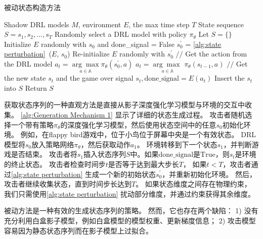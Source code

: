 \begin{algorithm}[!t]
    \caption{被动状态构造方法}
    \label{alg:Generation Mechanism 1}
    \begin{algorithmic}[1]
    \REQUIRE Shadow DRL models $M$, environment $E$, the max time step $T$
    \ENSURE State sequence $S = {s_1, s_2, ..., s_T}$
    \STATE Randomly select a DRL model with policy $\pi_{\theta}$
    \STATE Let $S = \{\}$
    \STATE Initialize $E$ randomly with $s_0$ and done\_signal = False
    \STATE $s_0^{\prime}$ = \autoref{alg:state perturbation}~($E$, $s_0$)
    \STATE Re-initialize $E$ randomly with $s_0^{\prime}$
    \STATE $//$ Get the action from the DRL model
    \STATE $a_t = \underset{a \in \mathbb{A}}{\arg \max \text{}} \pi_{\theta}(s_0^{\prime}, a) $
    \ELSE
    \STATE $a_t = \underset{a \in \mathbb{A}}{\arg \max \text{~}} \pi_{\theta}(s_{t-1}, a) $
    \ENDIF
    \STATE $//$ Get the new state $s_t$ and the game over signal
    \STATE $s_t, \text{done\_signal} = E(a_t) $
    \STATE Insert the $s_t$ into $S$
    \ENDFOR
    \STATE Return $S$
    \end{algorithmic}
\end{algorithm}
获取状态序列的一种直观方法是直接从影子深度强化学习模型与环境的交互中收集。
\autoref{alg:Generation Mechanism 1} 显示了详细的状态生成过程。
攻击者随机选择一个带有策略$\pi_{\theta}$的深度强化学习模型，然后使用状态空间中的任意$s_0$初始化环境。
例如，在flappy bird游戏中，位于小鸟位于屏幕中央是一个有效状态。
DRL模型将$s_0$放入策略网络$\pi_{\theta}$，然后获取动作$a_1$。
环境转移到下一个状态$s_1$，并判断游戏是否结束。
攻击者将$s_1$插入状态序列$S$中。如果$\text{done\_signal}$是$\text{True}$，则$s_t$是环境的终止状态。
攻击者检查时间步$t$是否等于达到最大步长$T$，
如果$t<T$，攻击者通过\autoref{alg:state perturbation} 生成一个新的初始状态$s^{\prime}_0$，并重新初始化环境。
然后，攻击者继续收集状态，直到时间步长达到$T$。
如果状态维度之间存在物理约束，
我们只需使用\autoref{alg:state perturbation} 扰动部分维度，并通过约束获得其余维度。

被动方法是一种有效的生成状态序列的策略。
然而，它也存在两个缺陷：
1) 没有充分利用白盒影子模型，例如白盒模型的模型权重、更新梯度信息；
2) 攻击模型容易因为静态状态序列而在影子模型上过拟合。


